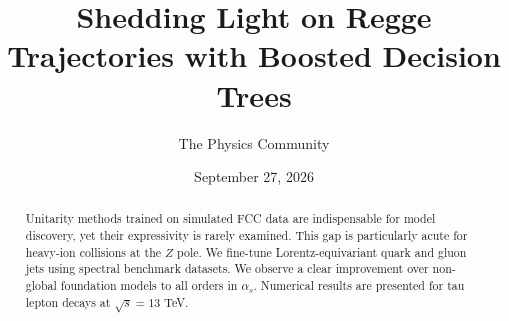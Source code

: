 \documentclass[11pt]{article}
\title{Shedding Light on Regge Trajectories with Boosted Decision Trees}
\author{The Physics Community}
\date{September 27, 2026}
\begin{document}
\maketitle
\begin{abstract}
Unitarity methods trained on simulated FCC data are indispensable for
model discovery, yet their expressivity is rarely examined. This gap is
particularly acute for heavy-ion collisions at the $Z$ pole. We
fine-tune Lorentz-equivariant quark and gluon jets using spectral
benchmark datasets. We observe a clear improvement over non-global
foundation models to all orders in $\alpha_s$. Numerical results are
presented for tau lepton decays at $\sqrt{s} = 13$ TeV.
\end{abstract}
\tableofcontents






\nocite{*}


\end{document}
